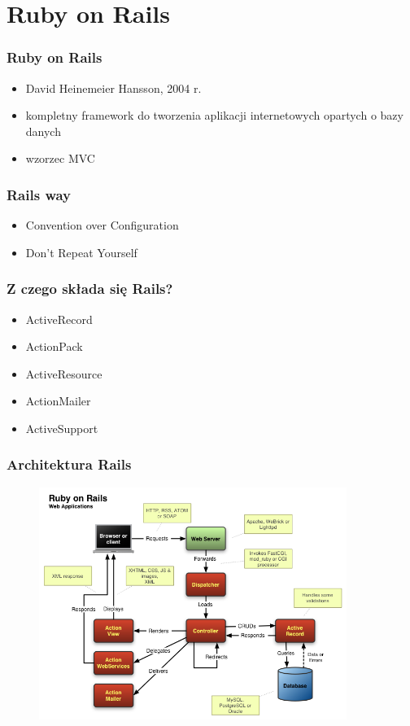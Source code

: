 \documentclass[12t]{beamer}
\begin{document}
\section{Ruby on Rails}
\begin{frame}
  \frametitle{Ruby on Rails}
  \begin{itemize}
  \item David Heinemeier Hansson, 2004 r.
  \item kompletny framework do tworzenia aplikacji internetowych
    opartych o bazy danych
  \item wzorzec MVC
  \end{itemize}
\end{frame}

\begin{frame}
  \frametitle{Rails way}
  \begin{itemize}
  \item Convention over Configuration
  \item Don't Repeat Yourself
  \end{itemize}
\end{frame}

\begin{frame}
  \frametitle{Z czego składa się Rails?}
  \begin{itemize}
  \item ActiveRecord
  \item ActionPack
  \item ActiveResource
  \item ActionMailer
  \item ActiveSupport
  \end{itemize}
\end{frame}

\begin{frame}
  \frametitle{Architektura Rails}
  \begin{figure}
    \centering
    \includegraphics[width=10cm]{rails_architecture.png}
  \end{figure}
\end{frame}
\end{document}
